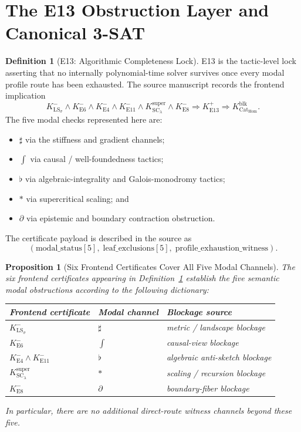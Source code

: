 \documentclass[11pt]{article}
\newtheorem{proposition}[theorem]{Proposition}
\theoremstyle{definition}
\newtheorem{definition}[theorem]{Definition}
\theoremstyle{remark}
\begin{document}
\section{The E13 Obstruction Layer and Canonical 3-SAT}

\begin{definition}[E13: Algorithmic Completeness Lock]\label{def-e13}
E13 is the tactic-level lock asserting that no internally polynomial-time solver survives once every modal profile route has been exhausted. The source manuscript records the frontend implication
\[
K_{\mathrm{LS}_\sigma}^- \wedge K_{\mathrm{E6}}^- \wedge K_{\mathrm{E4}}^- \wedge K_{\mathrm{E11}}^- \wedge K_{\mathrm{SC}_\lambda}^{\mathrm{super}} \wedge K_{\mathrm{E8}}^- \Rightarrow K_{\mathrm{E13}}^+ \Rightarrow K_{\mathrm{Cat}_{\mathrm{Hom}}}^{\mathrm{blk}}.
\]
The five modal checks represented here are:
\begin{itemize}
\item $\sharp$ via the stiffness and gradient channels;
\item $\int$ via causal / well-foundedness tactics;
\item $\flat$ via algebraic-integrality and Galois-monodromy tactics;
\item $\ast$ via supercritical scaling; and
\item $\partial$ via epistemic and boundary contraction obstruction.
\end{itemize}
The certificate payload is described in the source as
\[
(\mathrm{modal\_status}[5],\; \mathrm{leaf\_exclusions}[5],\; \mathrm{profile\_exhaustion\_witness}).
\]
\end{definition}

\begin{proposition}[Six Frontend Certificates Cover All Five Modal Channels]\label{prop-six-certificates-cover-five-channels}
The six frontend certificates appearing in Definition~\ref{def-e13} establish the five semantic modal obstructions according to the following dictionary:

\begin{center}
\small
\begin{tabular}{@{}lll@{}}
\toprule
Frontend certificate & Modal channel & Blockage source \\
\midrule
$K_{\mathrm{LS}_\sigma}^-$ & $\sharp$ & metric / landscape blockage \\
$K_{\mathrm{E6}}^-$ & $\int$ & causal-view blockage \\
$K_{\mathrm{E4}}^- \wedge K_{\mathrm{E11}}^-$ & $\flat$ & algebraic anti-sketch blockage \\
$K_{\mathrm{SC}_\lambda}^{\mathrm{super}}$ & $\ast$ & scaling / recursion blockage \\
$K_{\mathrm{E8}}^-$ & $\partial$ & boundary-fiber blockage \\
\bottomrule
\end{tabular}
\end{center}

In particular, there are no additional direct-route witness channels beyond these five.
\end{proposition}
\end{document}
